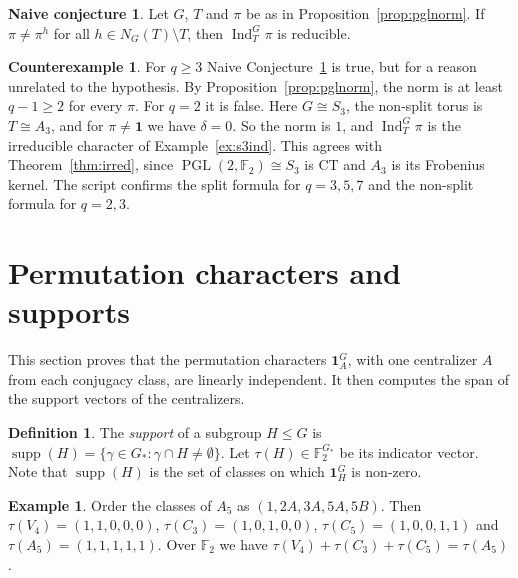 \documentclass[12pt,letterpaper]{article}
\numberwithin{equation}{section}
\theoremstyle{plain}
\theoremstyle{definition}
\newtheorem{definition}[theorem]{Definition}
\newtheorem{example}[theorem]{Example}
\newtheorem{counterexample}[theorem]{Counterexample}
\newtheorem{naiveconj}[theorem]{Naive conjecture}
\newcommand{\F}{\mathbb{F}}
\DeclareMathOperator{\Ind}{Ind}
\DeclareMathOperator{\supp}{supp}
\DeclareMathOperator{\PGL}{PGL}
\newcommand{\triv}{\mathbf{1}}
\begin{document}
\begin{naiveconj}\label{conj:pgltori}
Let $G$, $T$ and $\pi$ be as in Proposition~\ref{prop:pglnorm}. If
$\pi\neq\pi^h$ for all $h\in N_G(T)\setminus T$, then $\Ind_T^G\pi$ is
reducible.
\end{naiveconj}

\begin{counterexample}\label{cex:pglcor}
For $q\ge3$ Naive Conjecture~\ref{conj:pgltori} is true, but for a
reason unrelated to the hypothesis. By Proposition~\ref{prop:pglnorm}, the
norm is at least $q-1\ge2$ for every $\pi$. For $q=2$ it is false. Here
$G\cong S_3$, the non-split torus is $T\cong A_3$, and for $\pi\neq\triv$ we
have $\delta=0$. So the norm is $1$, and $\Ind_T^G\pi$ is the irreducible
character of Example~\ref{ex:s3ind}. This agrees with
Theorem~\ref{thm:irred}, since $\PGL(2,\F_2)\cong S_3$ is CT and $A_3$ is
its Frobenius kernel. The script confirms the split formula for $q=3,5,7$
and the non-split formula for $q=2,3$.
\end{counterexample}

\section{Permutation characters and supports}\label{sec:perm}

This section proves that the permutation characters $\triv_A^G$, with one
centralizer $A$ from each conjugacy class, are linearly independent. It then
computes the span of the support vectors of the centralizers.

\begin{definition}\label{def:supp}
The \emph{support} of a subgroup $H\le G$ is $\supp(H)=\{\gamma\in G_*:
\gamma\cap H\neq\emptyset\}$. Let $\tau(H)\in\F_2^{G_*}$ be its indicator
vector. Note that $\supp(H)$ is the set of classes on which $\triv_H^G$ is
non-zero.
\end{definition}

\begin{example}\label{ex:a5tau}
Order the classes of $A_5$ as $(1,2A,3A,5A,5B)$. Then $\tau(V_4)=(1,1,0,0,0)$,
$\tau(C_3)=(1,0,1,0,0)$, $\tau(C_5)=(1,0,0,1,1)$ and $\tau(A_5)=(1,1,1,1,1)$.
Over $\F_2$ we have $\tau(V_4)+\tau(C_3)+\tau(C_5)=\tau(A_5)$.
\end{example}
\end{document}
